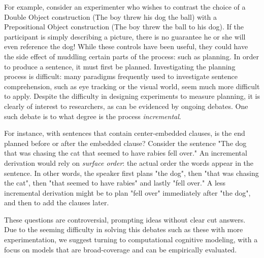 For example, consider an experimenter who wishes to contrast the choice of a Double Object construction (The boy threw his dog the ball) with a Prepositional Object construction (The boy threw the ball to his dog). If the participant is simply describing a picture, there is no guarantee he or she will even reference the dog! While these controls have been useful, they could have the side effect of muddling certain parts of the process: such as planning. In order to produce a sentence, it must first be planned. Investigating the planning process is difficult: many paradigms frequently used to investigate sentence comprehension, such as eye tracking or the visual world, seem much more difficult to apply. Despite the difficulty in designing experiments to measure planning, it is clearly of interest to researchers, as can be evidenced by ongoing debates. One such debate is to what degree is the process \emph{incremental}. 
 
For instance, with sentences that contain center-embedded clauses, is the end planned before or after the embedded clause? Consider the sentence "The dog that was chasing the cat that seemed to have rabies fell over." An incremental derivation would rely on \emph{surface order}: the actual order the words appear in the sentence. In other words, the speaker first plans "the dog", then "that was chasing the cat", then "that seemed to have rabies" and lastly "fell over." A less incremental derivation might be to plan "fell over" immediately after "the dog", and then to add the clauses later.
 
These questions are controversial, prompting ideas without clear cut answers. Due to the seeming difficulty in solving this debates such as these with more experimentation, we suggest turning to computational cognitive modeling, with a focus on models that are broad-coverage and can be empirically evaluated.
 
%